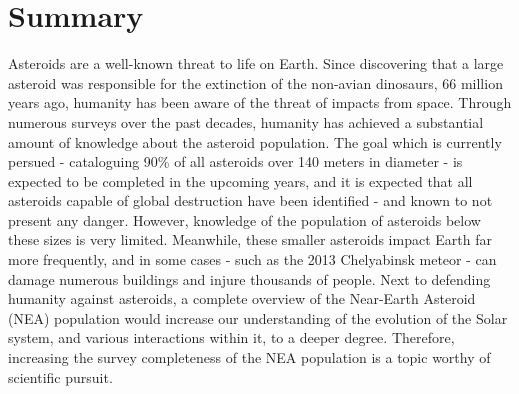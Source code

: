 \chapter{Summary}

Asteroids are a well-known threat to life on Earth. Since discovering that a large asteroid was responsible for the extinction of the non-avian dinosaurs, 66 million years ago, humanity has been aware of the threat of impacts from space. Through numerous surveys over the past decades, humanity has achieved a substantial amount of knowledge about the asteroid population. The goal which is currently persued - cataloguing 90\% of all asteroids over 140 meters in diameter - is expected to be completed in the upcoming years, and it is expected that all asteroids capable of global destruction have been identified - and known to not present any danger. However, knowledge of the population of asteroids below these sizes is very limited. Meanwhile, these smaller asteroids impact Earth far more frequently, and in some cases - such as the 2013 Chelyabinsk meteor - can damage numerous buildings and injure thousands of people. Next to defending humanity against asteroids, a complete overview of the Near-Earth Asteroid (NEA) population would increase our understanding of the evolution of the Solar system, and various interactions within it, to a deeper degree. Therefore, increasing the survey completeness of the NEA population is a topic worthy of scientific pursuit. \\


